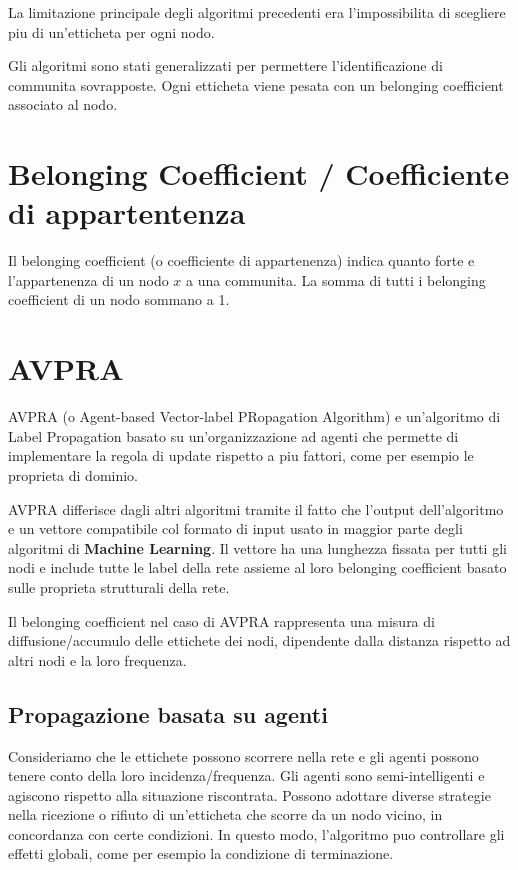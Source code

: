 \documentclass[a4paper,12pt]{report}
\begin{document}
	La limitazione principale degli algoritmi precedenti era l'impossibilita di scegliere piu di un'etticheta per ogni nodo. 

	Gli algoritmi sono stati generalizzati per permettere l'identificazione di communita sovrapposte. Ogni etticheta viene pesata con un belonging coefficient associato al nodo. 

	\section{Belonging Coefficient / Coefficiente di appartentenza}
	Il belonging coefficient (o coefficiente di appartenenza) indica quanto forte e l'appartenenza di un nodo $x$ a una communita. La somma di tutti i belonging coefficient di un nodo sommano a 1. \cite{gregory}

	\section{AVPRA}
	AVPRA (o Agent-based Vector-label PRopagation Algorithm) e un'algoritmo di Label Propagation basato su un'organizzazione ad agenti che permette di implementare la regola di update rispetto a piu fattori, come per esempio le proprieta di dominio. 

	AVPRA differisce dagli altri algoritmi tramite il fatto che l'output dell'algoritmo e un vettore compatibile col formato di input usato in maggior parte degli algoritmi di \textbf{Machine Learning}. Il vettore ha una lunghezza fissata per tutti gli nodi e include tutte le label della rete assieme al loro belonging coefficient basato sulle proprieta strutturali della rete. 

	Il belonging coefficient nel caso di AVPRA rappresenta una misura di diffusione/accumulo delle ettichete dei nodi, dipendente dalla distanza rispetto ad altri nodi e la loro frequenza. \cite{avpra} 

		\subsection{Propagazione basata su agenti}
		Consideriamo che le ettichete possono scorrere nella rete e gli agenti possono tenere conto della loro incidenza/frequenza. Gli agenti sono semi-intelligenti e agiscono rispetto alla situazione riscontrata. Possono adottare diverse strategie nella ricezione o rifiuto di un'etticheta che scorre da un nodo vicino, in concordanza con certe condizioni. In questo modo, l'algoritmo puo controllare gli effetti globali, come per esempio la condizione di terminazione.
\end{document}

